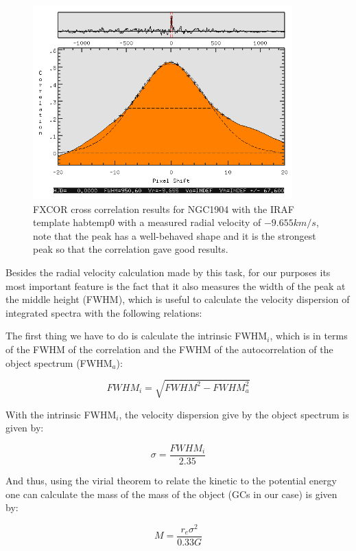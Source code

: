 \begin{figure}[]
\centering
\includegraphics[width=10cm]{images/fxcor.png}
\caption[FXCOR results for NGC1904]{FXCOR cross correlation results for NGC1904 with the IRAF template habtemp0 with a measured radial velocity of $-9.655km/s$, note that the peak has a well-behaved shape and it is the strongest peak so that the correlation gave good results.}
\end{figure}

Besides the radial velocity calculation made by this task, for our purposes its most important feature is the fact that it also measures the width of the peak at the middle height (FWHM), which is useful to calculate the velocity dispersion of integrated spectra with the following relations:

The first thing we have to do is calculate the intrinsic FWHM$_{i}$, which is in terms of the FWHM of the correlation and the FWHM of the autocorrelation of the object spectrum (FWHM$_{a}$):

\begin{equation}
FWHM_{i}=\sqrt{{FWHM^{2}}-{FWHM_{a}^{2}}}
\end{equation}

With the intrinsic FWHM$_{i}$, the velocity dispersion give by the object spectrum is given by:

\begin{equation}
\sigma=\frac{FWHM_{i}}{2.35}
\end{equation}

And thus, using the virial theorem to relate the kinetic to the potential energy one can calculate the mass of the mass of the object (GCs in our case) is given by:

\begin{equation}
M=\frac{r_{e}\sigma^{2}}{0.33G}
\end{equation}

